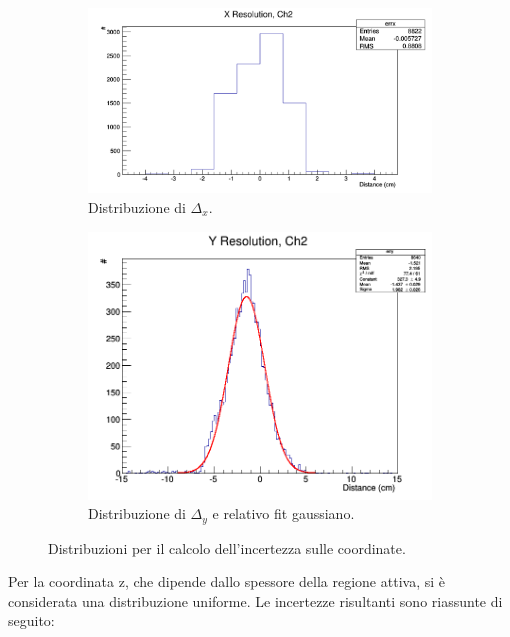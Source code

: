 \documentclass[8pt]{extarticle}
\begin{document}
\begin{figure}
\centering
\begin{subfigure}{.5\textwidth}
  \centering
  \includegraphics[width=1\linewidth]{errx}
  \caption{Distribuzione di $\Delta_x$.}
  \label{fig:errx}
\end{subfigure}%
\begin{subfigure}{.5\textwidth}
  \centering
  \includegraphics[width=1\linewidth]{erry}
  \caption{Distribuzione di $\Delta_y$ e relativo fit gaussiano.}
  \label{fig:erry}
\end{subfigure}
\caption{Distribuzioni per il calcolo dell'incertezza sulle coordinate.}
\label{fig:err_coordinate}
\end{figure}

Per la coordinata z, che dipende dallo spessore della regione attiva, si è considerata una distribuzione uniforme. Le incertezze risultanti sono riassunte di seguito:\\
\end{document}
